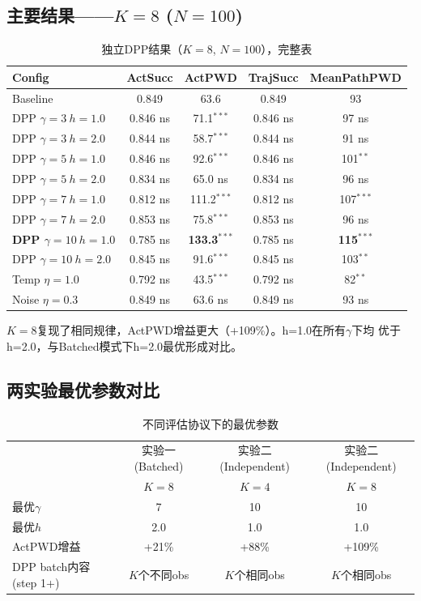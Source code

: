 \documentclass[11pt]{article}
\begin{document}
\subsection{主要结果——$K=8$ ($N=100$)}

\begin{table}[h]
\centering
\caption{独立DPP结果（$K=8$, $N=100$），完整表}
\begin{tabular}{lcccc}
\toprule
Config & ActSucc & ActPWD & TrajSucc & MeanPathPWD \\
\midrule
Baseline & 0.849 & 63.6 & 0.849 & 93 \\
DPP $\gamma{=}3\ h{=}1.0$ & 0.846 ns & 71.1$^{***}$ & 0.846 ns & 97 ns \\
DPP $\gamma{=}3\ h{=}2.0$ & 0.844 ns & 58.7$^{***}$ & 0.844 ns & 91 ns \\
DPP $\gamma{=}5\ h{=}1.0$ & 0.846 ns & 92.6$^{***}$ & 0.846 ns & 101$^{**}$ \\
DPP $\gamma{=}5\ h{=}2.0$ & 0.834 ns & 65.0 ns & 0.834 ns & 96 ns \\
DPP $\gamma{=}7\ h{=}1.0$ & 0.812 ns & 111.2$^{***}$ & 0.812 ns & 107$^{***}$ \\
DPP $\gamma{=}7\ h{=}2.0$ & 0.853 ns & 75.8$^{***}$ & 0.853 ns & 96 ns \\
\textbf{DPP $\gamma{=}10\ h{=}1.0$} & 0.785 ns & \textbf{133.3}$^{***}$ & 0.785 ns & \textbf{115}$^{***}$ \\
DPP $\gamma{=}10\ h{=}2.0$ & 0.845 ns & 91.6$^{***}$ & 0.845 ns & 103$^{**}$ \\
Temp $\eta{=}1.0$ & 0.792 ns & 43.5$^{***}$ & 0.792 ns & 82$^{**}$ \\
Noise $\eta{=}0.3$ & 0.849 ns & 63.6 ns & 0.849 ns & 93 ns \\
\bottomrule
\end{tabular}
\end{table}

$K=8$复现了相同规律，ActPWD增益更大（+109\%）。h=1.0在所有$\gamma$下均
优于h=2.0，与Batched模式下h=2.0最优形成对比。

\subsection{两实验最优参数对比}

\begin{table}[h]
\centering
\caption{不同评估协议下的最优参数}
\begin{tabular}{lccc}
\toprule
 & 实验一 (Batched) & 实验二 (Independent) & 实验二 (Independent) \\
 & $K=8$ & $K=4$ & $K=8$ \\
\midrule
最优$\gamma$ & 7 & 10 & 10 \\
最优$h$ & 2.0 & 1.0 & 1.0 \\
ActPWD增益 & +21\% & +88\% & +109\% \\
DPP batch内容(step 1+) & $K$个不同obs & $K$个相同obs & $K$个相同obs \\
\bottomrule
\end{tabular}
\end{table}
\end{document}
